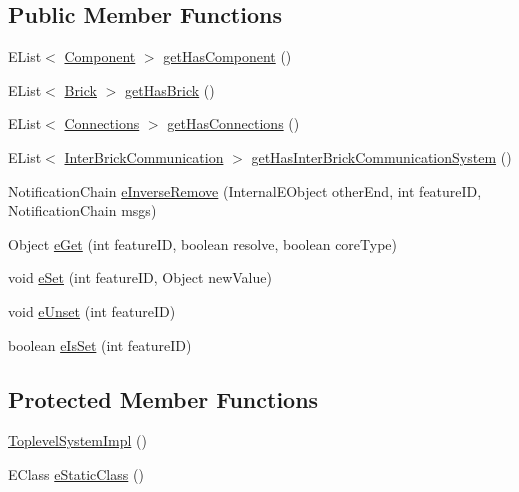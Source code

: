 \subsection*{Public Member Functions}
\begin{DoxyCompactItemize}
\item 
E\-List$<$ \hyperlink{interfaceshootingmachineemfmodel_1_1_component}{Component} $>$ \hyperlink{classshootingmachineemfmodel_1_1impl_1_1_toplevel_system_impl_a2c4366fdd20080d3612a84e0e71352a7}{get\-Has\-Component} ()
\item 
E\-List$<$ \hyperlink{interfaceshootingmachineemfmodel_1_1_brick}{Brick} $>$ \hyperlink{classshootingmachineemfmodel_1_1impl_1_1_toplevel_system_impl_abec9aaf492636fbdff5e1fba81413cc0}{get\-Has\-Brick} ()
\item 
E\-List$<$ \hyperlink{interfaceshootingmachineemfmodel_1_1_connections}{Connections} $>$ \hyperlink{classshootingmachineemfmodel_1_1impl_1_1_toplevel_system_impl_a6eb5ebd679d93fa77dbcbe3118defadc}{get\-Has\-Connections} ()
\item 
E\-List$<$ \hyperlink{interfaceshootingmachineemfmodel_1_1_inter_brick_communication}{Inter\-Brick\-Communication} $>$ \hyperlink{classshootingmachineemfmodel_1_1impl_1_1_toplevel_system_impl_aa988e6aa9d9405ebfba8d30a9e1c7689}{get\-Has\-Inter\-Brick\-Communication\-System} ()
\item 
Notification\-Chain \hyperlink{classshootingmachineemfmodel_1_1impl_1_1_toplevel_system_impl_a1553ff28d42382216fe7c8c260328b81}{e\-Inverse\-Remove} (Internal\-E\-Object other\-End, int feature\-I\-D, Notification\-Chain msgs)
\item 
Object \hyperlink{classshootingmachineemfmodel_1_1impl_1_1_toplevel_system_impl_a28ef3955a2cf117e72f78175bcc8cf1a}{e\-Get} (int feature\-I\-D, boolean resolve, boolean core\-Type)
\item 
void \hyperlink{classshootingmachineemfmodel_1_1impl_1_1_toplevel_system_impl_a66e3f5771b5c600772da98ae75d8c56a}{e\-Set} (int feature\-I\-D, Object new\-Value)
\item 
void \hyperlink{classshootingmachineemfmodel_1_1impl_1_1_toplevel_system_impl_acbb936b6cbb3b9cad8ff2e87a7fa0ba9}{e\-Unset} (int feature\-I\-D)
\item 
boolean \hyperlink{classshootingmachineemfmodel_1_1impl_1_1_toplevel_system_impl_a8ad66ff62ef96505480de4617ffb4a2f}{e\-Is\-Set} (int feature\-I\-D)
\end{DoxyCompactItemize}
\subsection*{Protected Member Functions}
\begin{DoxyCompactItemize}
\item 
\hyperlink{classshootingmachineemfmodel_1_1impl_1_1_toplevel_system_impl_a36095187e57dd78a392aeb16a8a9d02e}{Toplevel\-System\-Impl} ()
\item 
E\-Class \hyperlink{classshootingmachineemfmodel_1_1impl_1_1_toplevel_system_impl_a76e5b6690790866ff2853799a42ee3a1}{e\-Static\-Class} ()
\end{DoxyCompactItemize}
